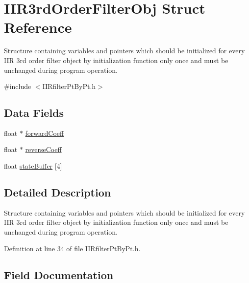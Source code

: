 \hypertarget{struct_i_i_r3rd_order_filter_obj}{}\section{I\+I\+R3rd\+Order\+Filter\+Obj Struct Reference}
\label{struct_i_i_r3rd_order_filter_obj}


Structure containing variables and pointers which should be initialized for every I\+IR 3rd order filter object by initialization function only once and must be unchanged during program operation.  




{\ttfamily \#include $<$I\+I\+Rfilter\+Pt\+By\+Pt.\+h$>$}

\subsection*{Data Fields}
\begin{DoxyCompactItemize}
\item 
float $\ast$ \mbox{\hyperlink{struct_i_i_r3rd_order_filter_obj_a8ce8a125811ae1ef41f12b57bda41654_a8ce8a125811ae1ef41f12b57bda41654}{forward\+Coeff}}
\item 
float $\ast$ \mbox{\hyperlink{struct_i_i_r3rd_order_filter_obj_a71cf702e70d0407aedf468a1d5f09242_a71cf702e70d0407aedf468a1d5f09242}{reverse\+Coeff}}
\item 
float \mbox{\hyperlink{struct_i_i_r3rd_order_filter_obj_ae9f84817b632b6a5201aef11129e44a4_ae9f84817b632b6a5201aef11129e44a4}{state\+Buffer}} \mbox{[}4\mbox{]}
\end{DoxyCompactItemize}


\subsection{Detailed Description}
Structure containing variables and pointers which should be initialized for every I\+IR 3rd order filter object by initialization function only once and must be unchanged during program operation. 

Definition at line 34 of file I\+I\+Rfilter\+Pt\+By\+Pt.\+h.



\subsection{Field Documentation}
\mbox{\label{struct_i_i_r3rd_order_filter_obj_a8ce8a125811ae1ef41f12b57bda41654_a8ce8a125811ae1ef41f12b57bda41654}} 
